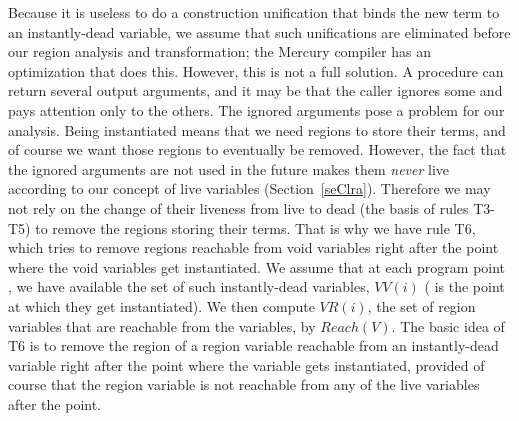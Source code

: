 \documentclass{tlp}
\newcommand{\VV}[1]{\ensuremath{\mathit{VV}(#1)}}
\newcommand{\VR}[1]{\ensuremath{\mathit{VR}(#1)}}
\newcommand{\Reach}[1]{\ensuremath{{Reach}(#1)}}
\begin{document}
Because it is useless to do a construction unification
that binds the new term to an instantly-dead variable,
we assume that such unifications are eliminated
before our region analysis and transformation;
the Mercury compiler has an optimization that does this.
However, this is not a full solution.
A procedure can return several output arguments,
and it may be that the caller ignores some
and pays attention only to the others.
The ignored arguments pose a problem for our analysis.
Being instantiated means that we need regions to store their terms,
and of course we want those regions to eventually be removed.
However, the fact that the ignored arguments are not used in the future
makes them \emph{never} live
according to our concept of live variables (Section~\ref{seClra}).
Therefore we may not rely on the change of their liveness from live to dead
(the basis of rules T3-T5)
to remove the regions storing their terms.
That is why we have rule T6,
which tries to remove regions reachable from void variables
right after the point where the void variables get instantiated.
We assume that at each program point ,
we have available the set of such instantly-dead variables, \VV{i}
( is the point at which they get instantiated).
We then compute \VR{i}, the set of region variables that
are reachable from the variables, by
\hbox{\raise-1mm\hbox{}} \Reach{V}.
The basic idea of T6 is to remove the region
of a region variable reachable from an instantly-dead variable
right after the point where the variable gets instantiated,
provided of course that the region variable
is not reachable from any of the live variables after the point.
\end{document}
